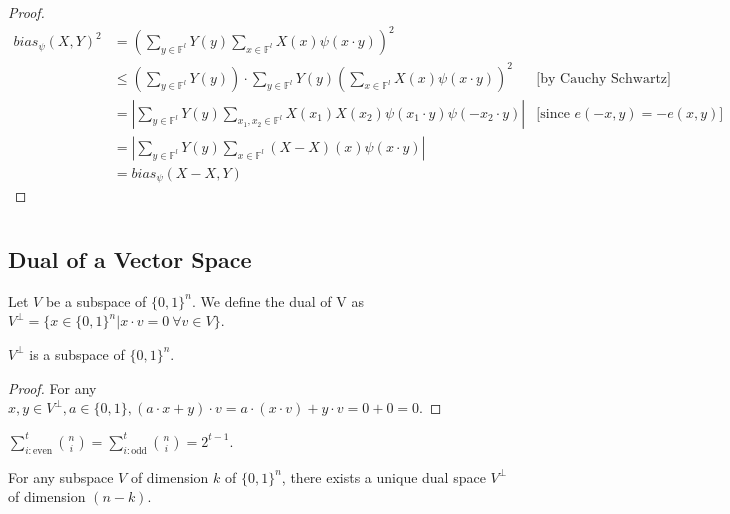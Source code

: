 \begin{proof}
\begin{align*}
bias_\psi(X,Y)^2
& = \left( \sum\limits_{y \in \mathbb{F}^l} Y(y) \sum\limits_{x \in \mathbb{F}^l} X(x) \psi(x \cdot y)\right)^2\\
& \leq \left( \sum\limits_{y \in \mathbb{F}^l} Y(y) \right) \cdot 
	   \sum\limits_{y \in \mathbb{F}^l} Y(y) \left( \sum\limits_{x \in \mathbb{F}^l} X(x) \psi(x \cdot y)\right)^2 & \text{[by Cauchy Schwartz]} \\
& = \left| \sum\limits_{y \in \mathbb{F}^l} Y(y)  \sum\limits_{x_1, x_2 \in \mathbb{F}^l} X(x_1) X(x_2) \psi(x_1 \cdot y) \psi(-x_2 \cdot y) \right| &\text{[since } e(-x,y) = -e(x,y)]\\
& = \left| \sum\limits_{y \in \mathbb{F}^l} Y(y) \sum\limits_{x \in \mathbb{F}^l} (X - X)(x) \psi(x \cdot y) \right| \\
&= bias_\psi(X - X, Y)
\end{align*}
\end{proof}

\appendix

\chapter{}
\section{Dual of a Vector Space}
\begin{definition} 
Let $V$ be a subspace of $\{0,1\}^n$. 
We define the dual of V as 
$V^\perp = \{ x \in \{ 0,1 \}^n | x \cdot v = 0 \ \forall v \in V \}$.
\end{definition}

\begin{theorem}
$V^\perp$ is a subspace of $\{ 0,1 \}^n$.
\end{theorem}

\begin{proof}
For any $x, y \in V^\perp, a \in \{0,1\}, (a \cdot x+y)\cdot v = a \cdot (x \cdot v) + y \cdot v = 0 + 0 = 0$. 
\end{proof} 

\begin{lemma} $\sum \limits_{i: \text{even}}^t {n \choose i} = 
\sum \limits_{i: \text{odd}}^t {n \choose i} = 2^{t-1} $.
\end{lemma}

\begin{theorem} For any subspace $V$ of dimension $k$ of $\{ 0,1 \}^n$, 
there exists a unique dual space $V^\perp$ of dimension $(n-k)$.
\end{theorem}

